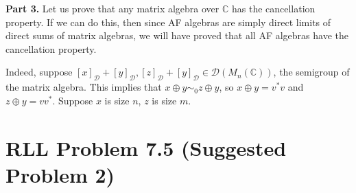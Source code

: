 \documentclass[aps,pra,showpacs,notitlepage,onecolumn,superscriptaddress,nofootinbib]{revtex4-1}
\theoremstyle{definition}
\begin{document}
\noindent \textbf{Part 3.} Let us prove that any matrix algebra over $\mathbb{C}$ has the cancellation property. If we can do this, then
since AF algebras are simply direct limits of direct sums of matrix algebras, we will have proved that all AF algebras have the cancellation property.
\newline

\noindent Indeed, suppose $[x]_{\mathcal{D}} + [y]_{\mathcal{D}}, [z]_{\mathcal{D}} + [y]_{\mathcal{D}} \in \mathcal{D}(M_n(\mathbb{C}))$, the semigroup of the matrix algebra. This implies that $x \oplus y \sim_0 z \oplus y$,
so $x \oplus y = v^{*} v$ and $z \oplus y = v v^{*}$. Suppose $x$ is size $n$, $z$ is size $m$.

\section{RLL Problem 7.5 (Suggested Problem 2)}

\noindent 
\end{document}
